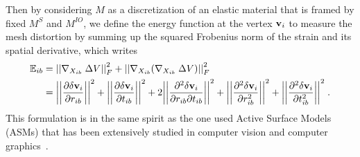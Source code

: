 Then by considering $M$ as a discretization of an elastic material that is framed by fixed $M^S$ and $M^{IO}$, we define the energy function at the vertex $\mathbf{v}_i$ to measure the mesh distortion by summing up the squared Frobenius norm of the strain and its spatial derivative, which writes
%
\begin{align}
\mathbb{E}_{ib} &= {\left| {\left| {\nabla_{X_{ib}} \; \Delta V} \right|} \right|^2_F} + {\left| {\left| {\nabla_{X_{ib}} (\nabla_{X_{ib}} \; \Delta V)} \right|} \right|^2_F} \nonumber \\
&=  {{{\left| {\left| {{{\partial \mathbf{\delta v}_i} \over {\partial r_{ib}}}} \right|} \right|}^2} + {{\left| {\left| {{{\partial \mathbf{\delta v}_i} \over {\partial t_{ib}}}} \right|} \right|}^2} + 2{{\left| {\left| {{{{\partial ^2}\mathbf{\delta v}_i} \over {\partial r_{ib}\partial t_{ib}}}} \right|} \right|}^2} + {{\left| {\left| {{{{\partial ^2}\mathbf{\delta v}_i} \over {\partial {r^2_{ib}}}}} \right|} \right|}^2} + {{\left| {\left| {{{{\partial ^2}\mathbf{\delta v}_i} \over {\partial {t^2_{ib}}}}} \right|} \right|}^2}} \;.
\label{ch3:eq:energy}
\end{align}
%
This formulation is in the same spirit as the one used Active Surface Models (ASMs) that has been extensively studied in computer vision and computer graphics~\cite{ai.Kass1988,ai.Terzopoulos1991b,ai.Fua1996f,aa.Wickramasinghe2021}.



